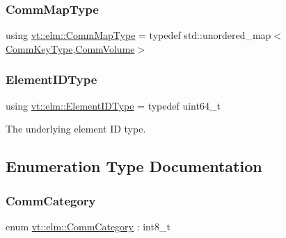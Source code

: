 \mbox{\label{namespacevt_1_1elm_a38487cb8896b9b4763efa9022fab560e}} 
\subsubsection{\texorpdfstring{Comm\+Map\+Type}{CommMapType}}
{\footnotesize\ttfamily using \hyperlink{namespacevt_1_1elm_a38487cb8896b9b4763efa9022fab560e}{vt\+::elm\+::\+Comm\+Map\+Type} = typedef std\+::unordered\+\_\+map$<$\hyperlink{namespacevt_1_1elm_a89067ebf8407548591583dd2f60b53b5}{Comm\+Key\+Type},\hyperlink{structvt_1_1elm_1_1_comm_volume}{Comm\+Volume}$>$}

\mbox{\label{namespacevt_1_1elm_a63afb64985b41b7b6dcf2f01336391f8}} 
\subsubsection{\texorpdfstring{Element\+I\+D\+Type}{ElementIDType}}
{\footnotesize\ttfamily using \hyperlink{namespacevt_1_1elm_a63afb64985b41b7b6dcf2f01336391f8}{vt\+::elm\+::\+Element\+I\+D\+Type} = typedef uint64\+\_\+t}



The underlying element ID type. 



\subsection{Enumeration Type Documentation}
\mbox{\label{namespacevt_1_1elm_ab7367fdbe88bdcf329563642147f9ae2}} 
\subsubsection{\texorpdfstring{Comm\+Category}{CommCategory}}
{\footnotesize\ttfamily enum \hyperlink{namespacevt_1_1elm_ab7367fdbe88bdcf329563642147f9ae2}{vt\+::elm\+::\+Comm\+Category} \+: int8\+\_\+t\hspace{0.3cm}{\ttfamily [strong]}}


